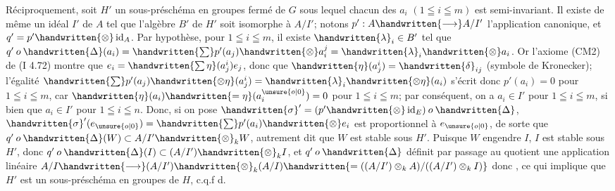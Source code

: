 Réciproquement, soit $H'$ un sous-préschéma en groupes fermé de $G$ sous lequel chacun des $a_i$ $(1\leqq i\leqq m)$ est semi-invariant.  Il existe de même un idéal $I'$ de $A$ tel que l'algèbre $B'$ de $H'$ soit isomorphe à $A/I'$; notons $p':A\handwritten{\longrightarrow}A/I'$ l'application canonique, et $q'=p'\handwritten{\otimes}\operatorname{id}_A$. Par hypothèse, pour $1\leqq i\leqq m$, il existe $\handwritten{\lambda}_i\in B'$ tel que $q'\mathbin{o}\handwritten{\Delta}(a_i)=\handwritten{\sum}p'(a_j)\handwritten{\otimes}a_i^j=\handwritten{\lambda}_i\handwritten{\otimes}a_i$. Or l'axiome (CM2) de (I 4.72) montre que $e_i=\handwritten{\sum\eta}(a_j^i)e_j$, donc que $\handwritten{\eta}(a_j^i)=\handwritten{\delta}_{ij}$ (symbole de Kronecker); l'égalité $\handwritten{\sum}p'(a_j)\handwritten{\otimes\eta}(a_j^i)=\handwritten{\lambda}_i\handwritten{\otimes\eta}(a_i)$ s'écrit donc $p'(a_i)=0$ pour $1\leqq i\leqq m$, car $\handwritten{\eta}(a_i)\handwritten{=\eta}(a_i^{\unsure{o|0}})=0$ pour $1\leqq i\leqq m$; par conséquent, on a $a_i\in I'$ pour $1\leqq i\leqq m$, si bien que $a_i\in I'$ pour $1\leqq i\leqq n$. Donc, si on pose $\handwritten{\sigma}'=(p'\handwritten{\otimes}\operatorname{id}_E)\mathbin{o}\handwritten{\Delta}$, $\handwritten{\sigma}'(e_{\unsure{o|0}})=\handwritten{\sum}p'(a_i)\handwritten{\otimes}e_i$ est proportionnel à $e_{\unsure{o|0}}$, de sorte que $q'\mathbin{o}\handwritten{\Delta}(W)\subset A/I'\handwritten{\otimes}_k W$, autrement dit que $W$ est stable sous $H'$. Puisque $W$ engendre $I$, $I$ est stable sous $H'$, donc $q'\mathbin{o}\handwritten{\Delta}(I)\subset(A/I')\handwritten{\otimes}_k I$, et $q'\mathbin{o}\handwritten{\Delta}$ définit par passage au quotient une application linéaire $A/I\handwritten{\longrightarrow}(A/I')\handwritten{\otimes}_k(A/I)\handwritten{=((A/I')\otimes_k A)/((A/I')\otimes_k I)}$ donc , ce qui implique que $H'$ est  un sous-préschéma en groupes de $H$, c.q.f d.

